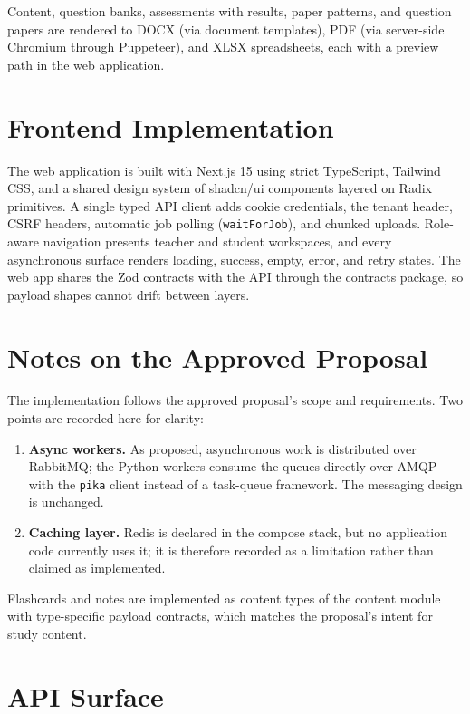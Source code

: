 Content, question banks, assessments with results, paper patterns, and
question papers are rendered to DOCX (via document templates), PDF (via
server-side Chromium through Puppeteer), and XLSX spreadsheets, each with a
preview path in the web application.

\section{Frontend Implementation}

The web application is built with Next.js 15 using strict TypeScript, Tailwind
CSS, and a shared design system of shadcn/ui components layered on Radix
primitives. A single typed API client adds cookie credentials, the tenant
header, CSRF headers, automatic job polling (\texttt{waitForJob}), and chunked
uploads. Role-aware navigation presents teacher and student workspaces, and
every asynchronous surface renders loading, success, empty, error, and retry
states. The web app shares the Zod contracts with the API through the
contracts package, so payload shapes cannot drift between layers.

\section{Notes on the Approved Proposal}

The implementation follows the approved proposal's scope and requirements.
Two points are recorded here for clarity:

\begin{enumerate}
  \item \textbf{Async workers.} As proposed, asynchronous work is distributed
        over RabbitMQ; the Python workers consume the queues directly over
        AMQP with the \texttt{pika} client instead of a task-queue framework.
        The messaging design is unchanged.
  \item \textbf{Caching layer.} Redis is declared in the compose stack, but no
        application code currently uses it; it is therefore recorded as a
        limitation rather than claimed as implemented.
\end{enumerate}

Flashcards and notes are implemented as content types of the content module
with type-specific payload contracts, which matches the proposal's intent for
study content.
\section{API Surface}

